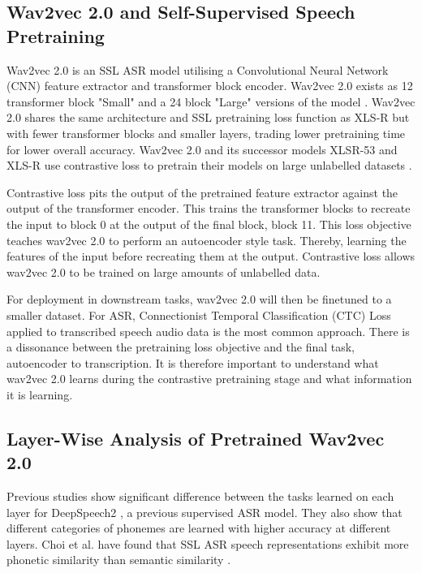 \subsection{Wav2vec 2.0 and Self-Supervised Speech Pretraining}\label{ed_subsec:background_wav2vec}
Wav2vec 2.0  is an SSL ASR model utilising a Convolutional Neural Network (CNN) \cite{krizhevsky2012imagenet} feature extractor and transformer block \cite{vaswani2017attention} encoder. Wav2vec 2.0 exists as 12 transformer block "Small" and a 24 block "Large" versions of the model \cite{wav2vec}. Wav2vec 2.0 shares the same architecture and SSL pretraining loss function as XLS-R \cite{babu2021xlsr} but with fewer transformer blocks and smaller layers, trading lower pretraining time for lower overall accuracy. Wav2vec 2.0 and its successor models XLSR-53 \cite{XLSR-53} and XLS-R \cite{babu2021xlsr} use contrastive loss to pretrain their models on large unlabelled datasets \cite{wav2vec}.%

Contrastive loss pits the output of the pretrained feature extractor against the output of the transformer encoder. This trains the transformer blocks to recreate the input to block 0 at the output of the final block, block 11. This loss objective teaches wav2vec 2.0 to perform an autoencoder \cite{hinton2006reducing} style task. Thereby, learning the features of the input before recreating them at the output. Contrastive loss allows wav2vec 2.0 to be trained on large amounts of unlabelled data. 

For deployment in downstream tasks, wav2vec 2.0 will then be finetuned to a smaller dataset. For ASR, Connectionist Temporal Classification (CTC) Loss \cite{graves2006connectionist} applied to transcribed speech audio data is the most common approach. There is a dissonance between the pretraining loss objective and the final task, autoencoder to transcription. It is therefore important to understand what wav2vec 2.0 learns during the contrastive pretraining stage and what information it is learning.

\subsection{Layer-Wise Analysis of Pretrained Wav2vec 2.0}
Previous studies show significant difference between the tasks learned on each layer\cite{belinkov2017analyzing} for DeepSpeech2 \cite{amodei2016deep}, a previous supervised ASR model. They also show that different categories of phonemes are learned with higher accuracy at different layers. Choi et al. \cite{choi2024self} have found that SSL ASR speech representations exhibit more phonetic similarity than semantic similarity \cite{choi2024self}. 

